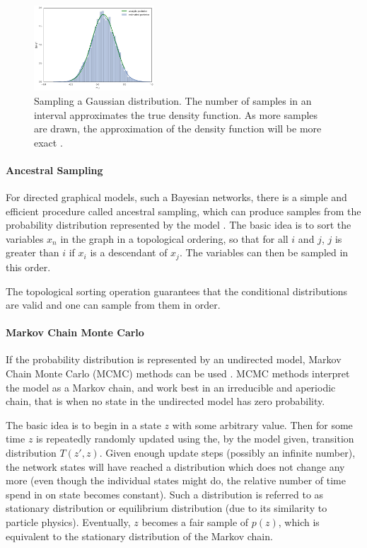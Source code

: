 \begin{figure}
	\centering
    	\includegraphics[width=0.4\textwidth]{imgs/sampling.png} 
    \caption[Sampling a Gaussian distribution.]{Sampling a Gaussian distribution. The number of samples in an interval approximates the true density function. As more samples are drawn, the approximation of the density function will be more exact \cite{sampleFD}.}
	\label{fig:Sampling}
\end{figure}



\paragraph{Ancestral Sampling} For directed graphical models, such a Bayesian networks, there is a simple and efficient procedure called ancestral sampling, which can produce samples from the probability distribution represented by the model \cite{Goodfellow-et-al-2016-Book}. 
The basic idea is to sort the variables $x_n$ in the graph in a topological ordering, so that for all $i$ and $j$, $j$ is greater than $i$ if $x_i$ is a descendant of $x_j$. The variables can then be sampled in this order.

The topological sorting operation guarantees that the conditional distributions are valid and one can sample from them in order.

\paragraph{Markov Chain Monte Carlo} If the probability distribution is represented by an undirected model, Markov Chain Monte Carlo (MCMC) methods can be used \cite{Goodfellow-et-al-2016-Book}. 
MCMC methods interpret the model as a Markov chain, and work best in an irreducible and aperiodic chain, that is when no state in the undirected model has zero probability.

The basic idea is to begin in a state $z$ with some arbitrary value. 
Then for some time $z$ is repeatedly randomly updated using the, by the model given, transition distribution $T(z',z)$. 
Given enough update steps (possibly an infinite number), the network states will have reached a distribution which does not change any more (even though the individual states might do, the relative number of time spend in on state becomes constant).
Such a distribution is referred to as stationary distribution or equilibrium distribution (due to its similarity to particle physics).
Eventually, $z$ becomes a fair sample of $p(z)$, which is equivalent to the stationary distribution of the Markov chain.

